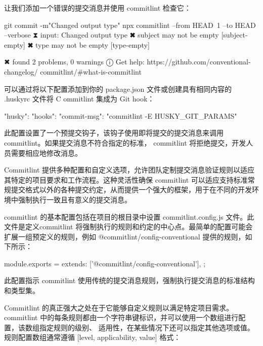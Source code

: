 让我们添加一个错误的提交消息并使用 commitlint 检查它：

\begin{shell}
git commit -m"Changed output type"
npx commitlint --from HEAD~1 --to HEAD --verbose
⧗ input: Changed output type
✖ subject may not be empty [subject-empty]
✖ type may not be empty [type-empty]

✖ found 2 problems, 0 warnings
ⓘ Get help: https://github.com/conventional-changelog/
commitlint/#what-is-commitlint
\end{shell}

可以通过将以下配置添加到你的 package.json 文件或创建具有相同内容的 .huskyrc 文件将 C ommitlint 集成为 Git hook：

\begin{shell}
"husky": {
    "hooks": {
        "commit-msg": "commitlint -E HUSKY_GIT_PARAMS"
    }
}
\end{shell}

此配置设置了一个预提交钩子，该钩子使用即将提交的提交消息来调用 commitlint。如果提交消息不符合指定的标准， commitlint 将拒绝提交，开发人员需要相应地修改消息。


Commitlint 提供多种配置和自定义选项，允许团队定制提交消息验证规则以适应其特定的项目要求和工作流程。这种灵活性确保 commitlint 可以适应支持标准常规提交格式以外的各种提交约定，从而提供一个强大的框架，用于在不同的开发环境中强制执行一致且有意义的提交消息。


commitlint 的基本配置包括在项目的根目录中设置 commitlint.config.js 文件。此文件是定义commitlint 将强制执行的规则和约定的中心点。最简单的配置可能会扩展一组预定义的规则，例如 @commitlint/config-conventional 提供的规则，如下所示：

\begin{shell}
module.exports = {
    extends: ['@commitlint/config-conventional'],
};
\end{shell}

此配置指示 commitlint 使用传统的提交消息规则，强制执行提交消息的标准结构和类型集。


Commitlint 的真正强大之处在于它能够自定义规则以满足特定项目需求。 commitlint 中的每条规则都由一个字符串键标识，并可以使用一个数组进行配置，该数组指定规则的级别、 适用性，在某些情况下还可以指定其他选项或值。规则配置数组通常遵循 [level, applicability, value] 格式：

